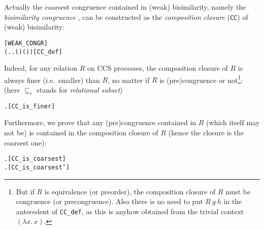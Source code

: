 Actually the coarsest congruence
contained in (weak) bisimilarity, namely the \emph{bisimilarity
  congruence} \cite{van2005characterisation}, can be constructed as
the \emph{composition closure} (\texttt{CC}) of (weak) bisimilarity:
\begin{alltt}
 \HOLSymConst{=}  \hfill{[WEAK_CONGR]}
  \HOLSymConst{=} (\HOLTokenLambda{} . \HOLSymConst{\HOLTokenForall{}}.   \HOLSymConst{\HOLTokenImp{}}  ( ) ( ))\hfill{[CC_def]}
\end{alltt}
Indeed, for any relation $R$ 
on CCS processes, the composition closure of $R$ is always finer (i.e.~smaller) than
$R$, no matter if $R$ is (pre)congruence or not\footnote{But if $R$ is
  equivalence (or preorder), the composition closure of $R$ must be congruence
  (or precongruence). Also there is no need to put $R\ g\ h$ in the antecedent of
  \texttt{CC\_def}, as this is anyhow obtained from the trivial context $(\lambda x.\,x)$.}:
(here $\subseteq_r$ stands for \emph{relational subset})
\begin{alltt}
\HOLTokenTurnstile{} \HOLSymConst{\HOLTokenForall{}}.   \HOLSymConst{\HOLTokenRSubset{}} \hfill{[CC_is_finer]}
\end{alltt}
Furthermore, we prove that any (pre)congruence contained in $R$ (which
itself may not be) is contained in the composition closure of $R$
(hence the closure is the coarsest one):
\begin{alltt}
\HOLTokenTurnstile{} \HOLSymConst{\HOLTokenForall{}} .   \HOLSymConst{\HOLTokenConj{}}  \HOLSymConst{\HOLTokenRSubset{}}  \HOLSymConst{\HOLTokenImp{}}  \HOLSymConst{\HOLTokenRSubset{}}  \hfill{[CC_is_coarsest]}
\HOLTokenTurnstile{} \HOLSymConst{\HOLTokenForall{}} .   \HOLSymConst{\HOLTokenConj{}}  \HOLSymConst{\HOLTokenRSubset{}}  \HOLSymConst{\HOLTokenImp{}}  \HOLSymConst{\HOLTokenRSubset{}}  \hfill{[CC_is_coarsest']}
\end{alltt}

